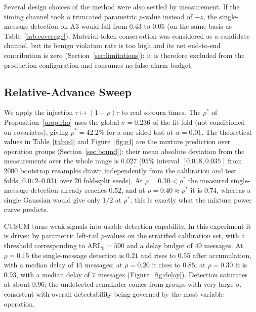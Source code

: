 \documentclass[manuscript,screen,review]{acmart}
\begin{document}
Several design choices of the method were also settled by measurement. If the timing channel took a truncated parametric $p$-value instead of $-z$, the single-message detection on {A3} would fall from $0.43$ to $0.06$ (on the same basis as Table~\ref{tab:coverage}). Material-token conservation was considered as a candidate channel, but its benign violation rate is too high and its net end-to-end contribution is zero (Section~\ref{sec:limitations}); it is therefore excluded from the production configuration and consumes no false-alarm budget.

\subsection{Relative-Advance Sweep}
\label{sec:e4}

We apply the injection $\tau\mapsto(1-\rho)\tau$ to real sojourn times. The $\rho^*$ of Proposition~\ref{prop:rho} uses the global $\sigma=0.236$ of the fit fold (not conditioned on covariates), giving $\rho^*=42.2\%$ for a one-sided test at $\alpha=0.01$. The theoretical values in Table~\ref{tab:e4} and Figure~\ref{fig:e4} are the mixture prediction over operation groups (Section~\ref{sec:bound}); their mean absolute deviation from the measurements over the whole range is $0.027$ ($95\%$ interval $[0.018,0.035]$ from $2000$ bootstrap resamples drawn independently from the calibration and test folds; $0.012$--$0.031$ over $20$ fold-split seeds). At $\rho=0.30<\rho^*$ the measured single-message detection already reaches $0.52$, and at $\rho=0.40\approx\rho^*$ it is $0.74$, whereas a single Gaussian would give only $1/2$ at $\rho^*$; this is exactly what the mixture power curve predicts.

{CUSUM} turns weak signals into usable detection capability. In this experiment it is driven by parametric left-tail $p$-values on the stratified calibration set, with a threshold corresponding to $\mathrm{ARL}_0=500$ and a delay budget of $40$ messages. At $\rho=0.15$ the single-message detection is $0.21$ and rises to $0.55$ after accumulation, with a median delay of $15$ messages; at $\rho=0.20$ it rises to $0.85$; at $\rho=0.30$ it is $0.93$, with a median delay of $7$ messages (Figure~\ref{fig:delay}). Detection saturates at about $0.96$; the undetected remainder comes from groups with very large $\sigma$, consistent with overall detectability being governed by the most variable operation.
\end{document}
